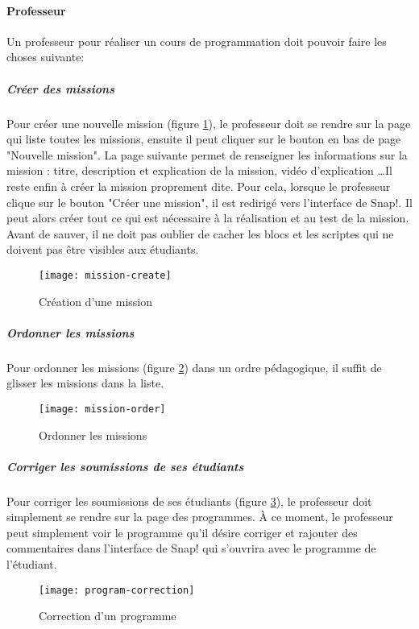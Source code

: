 \paragraph{Professeur}
Un professeur pour réaliser un cours de programmation doit pouvoir faire les choses suivante:
\subparagraph{Créer des missions} Pour créer une nouvelle mission (figure \ref{fig:mission-create}), le professeur doit se rendre sur la page qui liste toutes les missions, ensuite il peut cliquer sur le bouton en bas de page "Nouvelle mission". La page suivante permet de renseigner les informations sur la mission : titre, description et explication de la mission, vidéo d'explication \ldots Il reste enfin à créer la mission proprement dite. Pour cela, lorsque le professeur clique sur le bouton "Créer une mission", il est redirigé vers l'interface de Snap!. Il peut alors créer tout ce qui est nécessaire à la réalisation et au test de la mission. Avant de sauver, il ne doit pas oublier de cacher les blocs et les scriptes qui ne doivent pas être visibles aux étudiants.
\begin{figure}
  \begin{center}
    \texttt{[image: mission-create]}
    \caption{Création d'une mission}
    \label{fig:mission-create}
  \end{center}
\end{figure}

\subparagraph{Ordonner les missions} Pour ordonner les missions (figure \ref{fig:mission-order}) dans un ordre pédagogique, il suffit de glisser les missions dans la liste.
\begin{figure}
  \begin{center}
    \texttt{[image: mission-order]}
    \caption{Ordonner les missions}
    \label{fig:mission-order}
  \end{center}
\end{figure}

\subparagraph{Corriger les soumissions de ses étudiants} Pour corriger les soumissions de ses étudiants (figure \ref{fig:program-correction}), le professeur doit simplement se rendre sur la page des programmes. À ce moment, le professeur peut simplement voir le programme qu'il désire corriger et rajouter des commentaires dans l'interface de Snap! qui s’ouvrira avec le programme de l'étudiant.
\begin{figure}
  \begin{center}
    \texttt{[image: program-correction]}
    \caption{Correction d'un programme}
    \label{fig:program-correction}
  \end{center}
\end{figure}

